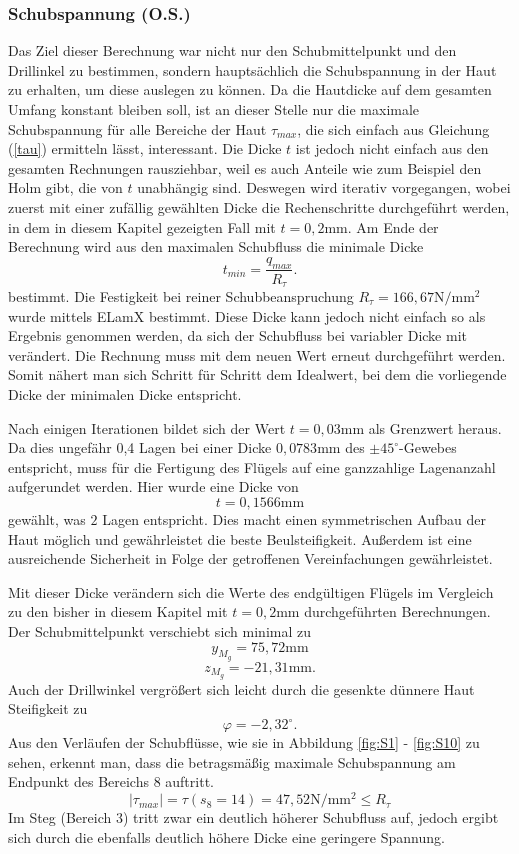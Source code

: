 \subsubsection{Schubspannung (O.S.)}
Das Ziel dieser Berechnung war nicht nur den Schubmittelpunkt und den Drillinkel zu bestimmen, sondern hauptsächlich die Schubspannung in der Haut zu erhalten, um diese auslegen zu können. Da die Hautdicke auf dem gesamten Umfang konstant bleiben soll, ist an dieser Stelle nur die maximale Schubspannung für alle Bereiche der Haut $\tau_{max}$, die sich einfach aus Gleichung (\ref{tau}) ermitteln lässt, interessant. Die Dicke $t$ ist jedoch nicht einfach aus den gesamten Rechnungen rausziehbar, weil es auch Anteile wie zum Beispiel den Holm gibt, die von $t$ unabhängig sind. Deswegen wird iterativ vorgegangen, wobei zuerst mit einer zufällig gewählten Dicke die Rechenschritte durchgeführt werden, in dem in diesem Kapitel gezeigten Fall mit $t=0,2\mathrm{mm}$. Am Ende der Berechnung wird aus den maximalen Schubfluss die minimale Dicke
\begin{equation}
	t_{min} = \frac{q_{max}}{R_{\tau}}.
\end{equation} 
bestimmt. Die Festigkeit bei reiner Schubbeanspruchung $R_{\tau} = 166,67\mathrm{N/mm^2}$ wurde mittels ELamX bestimmt. Diese Dicke kann jedoch nicht einfach so als Ergebnis genommen werden, da sich der Schubfluss bei variabler Dicke mit verändert. Die Rechnung muss mit dem neuen Wert erneut durchgeführt werden. Somit nähert man sich Schritt für Schritt dem Idealwert, bei dem die vorliegende Dicke der minimalen Dicke entspricht.

\noindent
Nach einigen Iterationen bildet sich der Wert $t = 0,03\mathrm{mm}$ als Grenzwert heraus. Da dies ungefähr 0,4 Lagen bei einer Dicke $0,0783\mathrm{mm}$ des $\pm45^\circ$-Gewebes entspricht, muss für die Fertigung des Flügels auf eine ganzzahlige Lagenanzahl aufgerundet werden. Hier wurde eine Dicke von 
\begin{equation}
	t = 0,1566 \mathrm{mm}
\end{equation}
gewählt, was $2$ Lagen entspricht. Dies macht einen symmetrischen Aufbau der Haut möglich und gewährleistet die beste Beulsteifigkeit. Außerdem ist eine ausreichende Sicherheit in Folge der getroffenen Vereinfachungen gewährleistet.

\noindent Mit dieser Dicke verändern sich die Werte des endgültigen Flügels im Vergleich zu den bisher in diesem Kapitel mit $t=0,2\mathrm{mm}$ durchgeführten Berechnungen. Der Schubmittelpunkt verschiebt sich minimal zu
$$
	y_{M_{g}}=75,72\mathrm{mm}
$$
$$
	z_{M_{g}}=-21,31\mathrm{mm}.
$$
Auch der Drillwinkel vergrößert sich leicht durch die gesenkte dünnere Haut Steifigkeit zu
$$
	\varphi =-2,32 ^\circ.
$$
Aus den Verläufen der Schubflüsse, wie sie in Abbildung \ref{fig:S1} - \ref{fig:S10} zu sehen, erkennt man, dass die betragsmäßig maximale Schubspannung am Endpunkt des Bereichs 8 auftritt.
$$
	|\tau_{max}|=\tau(s_8=14)=47,52\mathrm{N/mm^2}\leq R_{\tau}
$$
Im Steg (Bereich 3) tritt zwar ein deutlich höherer Schubfluss auf, jedoch ergibt sich durch die ebenfalls deutlich höhere Dicke eine geringere Spannung.







